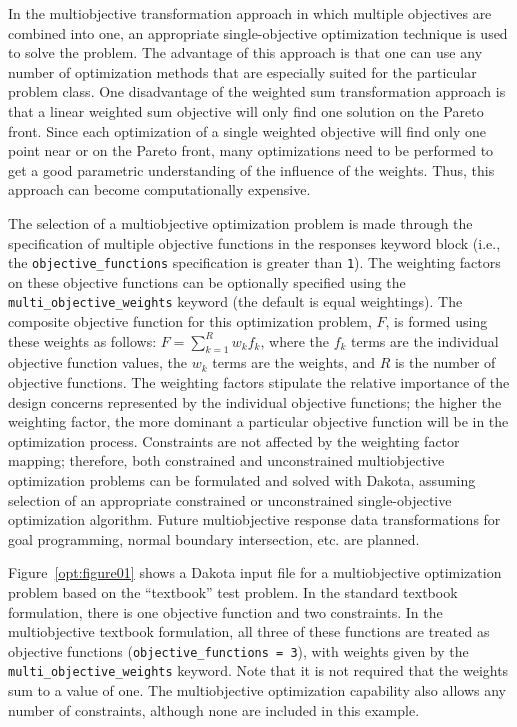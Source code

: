 In the multiobjective transformation approach in which multiple
objectives are combined into one, an appropriate single-objective
optimization technique is used to solve the problem. The advantage of
this approach is that one can use any number of optimization methods
that are especially suited for the particular problem class. One
disadvantage of the weighted sum transformation approach is that a
linear weighted sum objective will only find one solution on 
the Pareto front.  
Since each optimization of a single
weighted objective will find only one point near or on the Pareto
front, many optimizations need to be performed to get a good
parametric understanding of the influence of the weights.
Thus, this approach can become computationally expensive. 

The selection of a multiobjective optimization problem is made through
the specification of multiple objective functions in the responses
keyword block (i.e., the \texttt{objective\_functions}
specification is greater than \texttt{1}). The weighting factors on
these objective functions can be optionally specified using the
\texttt{multi\_objective\_weights} keyword (the default is equal
weightings). The composite objective function for this optimization
problem, $F$, is formed using these weights as follows:
$F=\sum_{k=1}^{R}w_{k}f_{k}$, where the $f_{k}$ terms are the
individual objective function values, the $w_{k}$ terms are the
weights, and $R$ is the number of objective functions. The weighting
factors stipulate the relative importance of the design concerns
represented by the individual objective functions; the higher the
weighting factor, the more dominant a particular objective function
will be in the optimization process. Constraints are not affected by
the weighting factor mapping; therefore, both constrained and
unconstrained multiobjective optimization problems can be formulated
and solved with Dakota, assuming selection of an appropriate
constrained or unconstrained single-objective optimization algorithm.
Future multiobjective response data transformations for goal
programming, normal boundary intersection, etc. are planned.

Figure~\ref{opt:figure01} shows a Dakota input file for a
multiobjective optimization problem based on the ``textbook'' test
problem. 
In the standard textbook formulation,
there is one objective function and two constraints. In the
multiobjective textbook formulation, all three of these functions are
treated as objective functions (\texttt{objective\_functions =
  3}), with weights given by the \texttt{multi\_objective\_weights}
keyword. Note that it is not required that the weights sum to a value
of one. The multiobjective optimization capability also allows any
number of constraints, although none are included in this example.

